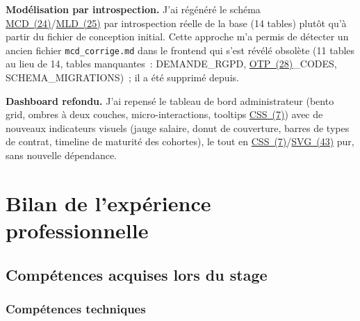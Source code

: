 \documentclass[12pt,a4paper]{report}
\begin{document}
\textbf{Modélisation par introspection.} J'ai régénéré le schéma \hyperlink{abbr-MCD}{MCD~(24)}/\hyperlink{abbr-MLD}{MLD~(25)} par introspection réelle de la base (14 tables) plutôt qu'à partir du fichier de conception initial. Cette approche m'a permis de détecter un ancien fichier \texttt{mcd\_corrige.md} dans le frontend qui s'est révélé obsolète (11 tables au lieu de 14, tables manquantes~: DEMANDE\_RGPD, \hyperlink{abbr-OTP}{OTP~(28)}\_CODES, SCHEMA\_MIGRATIONS)~; il a été supprimé depuis.

\textbf{Dashboard refondu.} J'ai repensé le tableau de bord administrateur (bento grid, ombres à deux couches, micro-interactions, tooltips \hyperlink{abbr-CSS}{CSS~(7)}) avec de nouveaux indicateurs visuels (jauge salaire, donut de couverture, barres de types de contrat, timeline de maturité des cohortes), le tout en \hyperlink{abbr-CSS}{CSS~(7)}/\hyperlink{abbr-SVG}{SVG~(43)} pur, sans nouvelle dépendance.

\chapter{Bilan de l'expérience professionnelle}

\section{Compétences acquises lors du stage}

\subsection{Compétences techniques}
\end{document}
